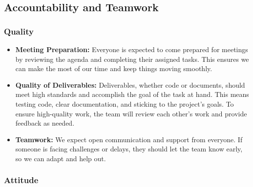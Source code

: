 \documentclass{article}
\begin{document}
\subsection*{Accountability and Teamwork}

\subsubsection*{Quality} 

\begin{itemize}
    \item \textbf{Meeting Preparation:}  
    Everyone is expected to come prepared for meetings by reviewing the agenda and completing their assigned tasks. This ensures we can make the most of our time and keep things moving smoothly.

    \item \textbf{Quality of Deliverables:}  
    Deliverables, whether code or documents, should meet high standards and accomplish the goal of the task at hand. This means testing code, clear documentation, and sticking to the project's goals. To ensure high-quality work, the team will review each other's work and provide feedback as needed.

    \item \textbf{Teamwork:}  
    We expect open communication and support from everyone. If someone is facing challenges or delays, they should let the team know early, so we can adapt and help out.
\end{itemize}

\subsubsection*{Attitude}
\end{document}
